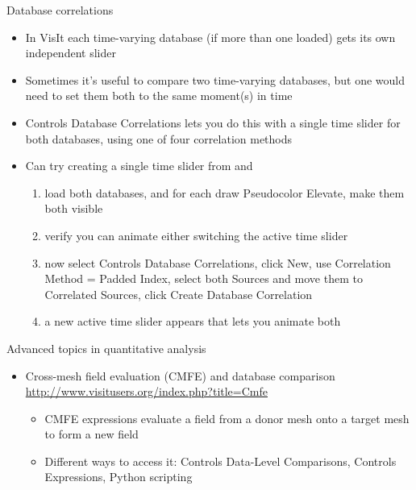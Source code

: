 \begin{frame}{Database correlations}
  \begin{itemize}\setlength{\itemsep}{2mm}
  \item In VisIt each time-varying database (if more than one loaded) gets its own independent slider
  \item Sometimes it's useful to compare two time-varying databases, but one would need to set them both
    to the same moment(s) in time
  \item Controls \ra Database Correlations lets you do this with a single time slider for both databases,
    using one of four correlation methods
    \pause
  \item Can try creating a single time slider from  and 
    \begin{enumerate}\setlength{\itemsep}{0mm}
    \item load both databases, and for each draw Pseudocolor \ra Elevate, make them both visible
    \item verify you can animate either switching the active time slider
    \item now select Controls \ra Database Correlations, click New, use Correlation Method = Padded
      Index, select both Sources and move them to Correlated Sources, click Create Database Correlation
    \item a new active time slider appears that lets you animate both
    \end{enumerate}
  \end{itemize}
\end{frame}

\begin{frame}{Advanced topics in quantitative analysis}
  \begin{itemize}\setlength{\itemsep}{3mm}
  \item Cross-mesh field evaluation (CMFE) and database comparison
    \url{http://www.visitusers.org/index.php?title=Cmfe}
    \begin{itemize}\setlength{\itemsep}{0mm}
    \item CMFE expressions evaluate a field from a donor mesh onto a target mesh to form a new field
    \item Different ways to access it: Controls \ra Data-Level Comparisons, Controls \ra Expressions,
      Python scripting
    \end{itemize}
  \end{itemize}
\end{frame}
